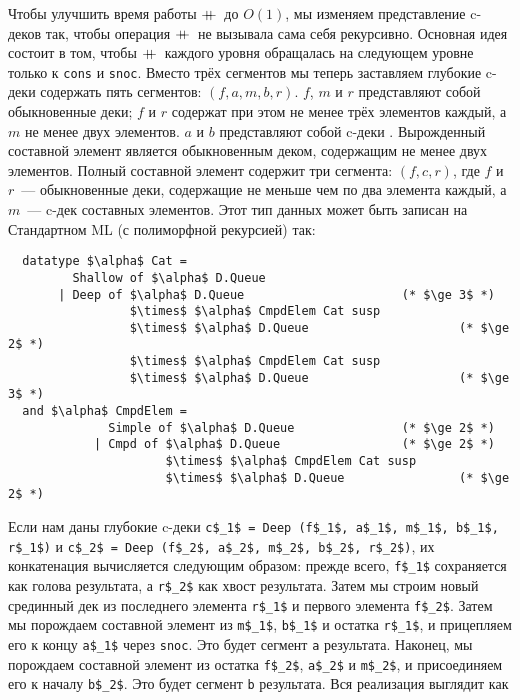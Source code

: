 Чтобы улучшить время работы $+\!\!\!+\,$ до $O(1)$, мы изменяем
представление c-деков так, чтобы операция $+\!\!\!+\,$ не вызывала сама
себя рекурсивно. Основная идея состоит в том, чтобы $+\!\!\!+\,$ каждого уровня
обращалась на следующем уровне только к \lstinline!cons! и
\lstinline!snoc!. Вместо трёх сегментов мы теперь заставляем глубокие
c-деки содержать пять сегментов: $(f, a, m, b, r)$. $f$, $m$ и $r$
представляют собой обыкновенные деки; $f$ и $r$ содержат при этом не
менее трёх элементов каждый, а $m$ не менее двух элементов. $a$ и $b$
представляют собой c-деки . Вырожденный составной элемент является обыкновенным деком,
содержащим не менее двух элементов.  Полный составной элемент содержит
три сегмента: $(f, c, r)$, где $f$ и $r$~--- обыкновенные деки,
содержащие не меньше чем по два элемента каждый, а $m$~--- c-дек
составных элементов. Этот тип данных может быть записан на Стандартном
ML (с полиморфной рекурсией) так:
\begin{lstlisting}
  datatype $\alpha$ Cat =
         Shallow of $\alpha$ D.Queue
       | Deep of $\alpha$ D.Queue                      (* $\ge 3$ *)
                 $\times$ $\alpha$ CmpdElem Cat susp
                 $\times$ $\alpha$ D.Queue                     (* $\ge 2$ *)
                 $\times$ $\alpha$ CmpdElem Cat susp
                 $\times$ $\alpha$ D.Queue                     (* $\ge 3$ *)
  and $\alpha$ CmpdElem =
              Simple of $\alpha$ D.Queue               (* $\ge 2$ *)
            | Cmpd of $\alpha$ D.Queue                 (* $\ge 2$ *)
                      $\times$ $\alpha$ CmpdElem Cat susp
                      $\times$ $\alpha$ D.Queue                (* $\ge 2$ *)
\end{lstlisting}
Если нам даны глубокие c-деки
\lstinline!c$_1$ = Deep (f$_1$, a$_1$, m$_1$, b$_1$, r$_1$)! и
\lstinline!c$_2$ = Deep (f$_2$, a$_2$, m$_2$, b$_2$, r$_2$)!, их
конкатенация вычисляется следующим образом: прежде всего,
\lstinline!f$_1$! сохраняется как голова результата, а
\lstinline!r$_2$! как хвост результата. Затем мы строим новый
срединный дек из последнего элемента \lstinline!r$_1$! и первого
элемента \lstinline!f$_2$!.  Затем мы порождаем составной элемент из
\lstinline!m$_1$!, \lstinline!b$_1$! и остатка \lstinline!r$_1$!, и
прицепляем его к концу \lstinline!a$_1$! через \lstinline!snoc!. Это
будет сегмент \lstinline!a! результата. Наконец, мы порождаем
составной элемент из остатка \lstinline!f$_2$!, \lstinline!a$_2$! и
\lstinline!m$_2$!, и присоединяем его к началу \lstinline!b$_2$!. Это
будет сегмент \lstinline!b! результата. Вся реализация выглядит как
